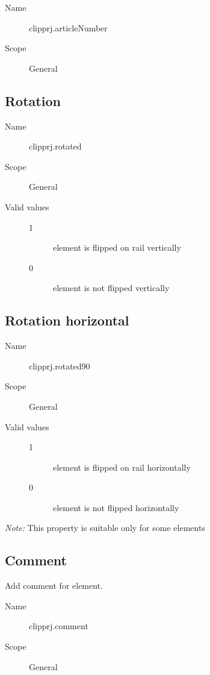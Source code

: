 \documentclass[%
	a4paper,
	oneside,
	listof=numbered,
	parskip=half,
	headsepline=true,
	footsepline=false,
	normalheadings,
	0.7headlines,
	headexclude,
	]{scrbook}
\begin{document}
\begin{description}
	\item[Name] clipprj.articleNumber
	\item[Scope] General
\end{description}

\subsection{Rotation}

\begin{description}
	\item[Name] clipprj.rotated
	\item[Scope] General
	\item[Valid values]
	\begin{description}
		\item[1] element is flipped on rail vertically
		\item[0] element is not flipped vertically
	\end{description}
\end{description}

\subsection{Rotation horizontal}

\begin{description}
	\item[Name] clipprj.rotated90
	\item[Scope] General
	\item[Valid values]
	\begin{description}
		\item[1] element is flipped on rail horizontally
		\item[0] element is not flipped horizontally
	\end{description}
\end{description}

\emph{Note:} This property is suitable only for some elements

\subsection{Comment}

Add comment for element.

\begin{description}
	\item[Name] clipprj.comment
	\item[Scope] General
\end{description}
\end{document}
